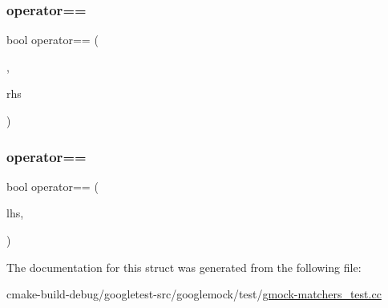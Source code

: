 \subsubsection{\texorpdfstring{operator==}{operator==}\hspace{0.1cm}{\footnotesize\ttfamily [1/2]}}
{\footnotesize\ttfamily bool operator== (\begin{DoxyParamCaption}\item[{const \mbox{\hyperlink{structtesting_1_1gmock__matchers__test_1_1NonImplicitlyConstructibleTypeWithOperatorEq}{Non\+Implicitly\+Constructible\+Type\+With\+Operator\+Eq}} \&}]{,  }\item[{int}]{rhs }\end{DoxyParamCaption})\hspace{0.3cm}{\ttfamily [friend]}}

\mbox{\label{structtesting_1_1gmock__matchers__test_1_1NonImplicitlyConstructibleTypeWithOperatorEq_a801c8151d7f7ff24243019980934d143}} 
\subsubsection{\texorpdfstring{operator==}{operator==}\hspace{0.1cm}{\footnotesize\ttfamily [2/2]}}
{\footnotesize\ttfamily bool operator== (\begin{DoxyParamCaption}\item[{int}]{lhs,  }\item[{const \mbox{\hyperlink{structtesting_1_1gmock__matchers__test_1_1NonImplicitlyConstructibleTypeWithOperatorEq}{Non\+Implicitly\+Constructible\+Type\+With\+Operator\+Eq}} \&}]{ }\end{DoxyParamCaption})\hspace{0.3cm}{\ttfamily [friend]}}



The documentation for this struct was generated from the following file\+:\begin{DoxyCompactItemize}
\item 
cmake-\/build-\/debug/googletest-\/src/googlemock/test/\mbox{\hyperlink{gmock-matchers__test_8cc}{gmock-\/matchers\+\_\+test.\+cc}}\end{DoxyCompactItemize}
